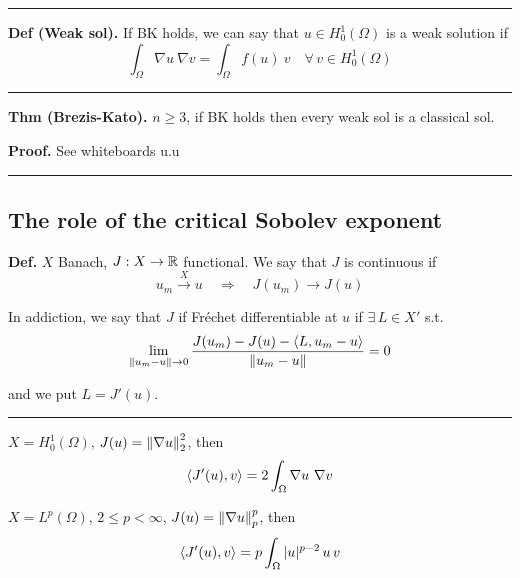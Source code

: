 \vspace{-1em}

\rule{0.31\textwidth}{0.2pt}
\smallskip

\textbf{Def (Weak sol).} If BK holds, we can say that $u\in H^1_0(\Omega)$ is a weak solution if
\begin{equation*}
\int_\Omega \nabla u\ \nabla v=\int_\Omega f(u)\ v\quad\forall\,v\in H^1_0(\Omega)
\end{equation*}

\rule{0.31\textwidth}{0.2pt}
\smallskip

\textbf{Thm (Brezis-Kato).} $n\geq 3$, if BK holds then every weak sol is a classical sol.

\smallskip

\textbf{\color{lavender(floral)}Proof.} See whiteboards u.u

\rule{0.31\textwidth}{0.2pt}


\subsection{\texorpdfstring{\color{red}The role of the critical Sobolev exponent}{}}


\textbf{Def.} $X$ Banach, $J:X\to\mathbb{R}$ functional. We say that $J$ is continuous if
\begin{equation*}
u_m\xrightarrow{X} u\quad \Longrightarrow\quad J(u_m)\rightarrow J(u)
\end{equation*}

In addiction, we say that $J$ if Fréchet differentiable at $u$ if $\exists\,L\in X'$ s.t.
\begin{equation*}
\lim_{\left\lVert u_m-u \right\rVert\to 0}\frac{J(u_m)-J(u)-\left\langle L,u_m-u \right\rangle}{\left\lVert u_m-u \right\rVert} =0
\end{equation*}

and we put $L=J'(u)$.

\rule{0.31\textwidth}{0.2pt}
\smallskip

$X=H^1_0(\Omega)$, $J(u)=\left\lVert \nabla u \right\rVert_2^2$, then
\begin{equation*}
\left\langle J'(u),v \right\rangle=2\int_\Omega \nabla u\ \nabla v
\end{equation*}

$X=L^p(\Omega)$, $2\leq p <\infty$, $J(u)=\left\lVert \nabla u \right\rVert_p^p$, then
\begin{equation*}
\left\langle J'(u),v \right\rangle=p\int_\Omega |u|^{p-2}\,u\,v
\end{equation*}


